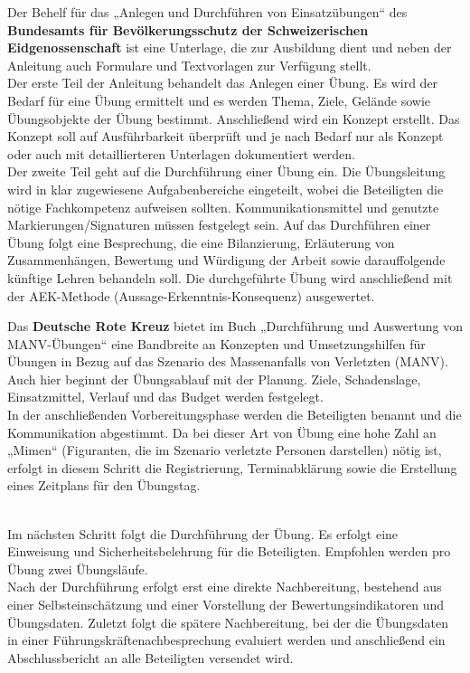 Der Behelf für das „Anlegen und Durchführen von Einsatzübungen“ des \textbf{Bundesamts für Bevölkerungsschutz der Schweizerischen Eidgenossenschaft} \autocite{Behelf_Einsatzübungen} ist eine Unterlage, die zur Ausbildung dient und neben der Anleitung auch Formulare und Textvorlagen zur Verfügung stellt. \\
Der erste Teil der Anleitung behandelt das Anlegen einer Übung. Es wird der Bedarf für eine Übung ermittelt und es werden Thema, Ziele, Gelände sowie Übungsobjekte der Übung bestimmt. Anschließend wird ein Konzept erstellt. Das Konzept soll auf Ausführbarkeit überprüft und je nach Bedarf nur als Konzept oder auch mit detaillierteren Unterlagen dokumentiert werden. \\
Der zweite Teil geht auf die Durchführung einer Übung ein. Die Übungsleitung wird in klar zugewiesene Aufgabenbereiche eingeteilt, wobei die Beteiligten die nötige Fachkompetenz aufweisen sollten. Kommunikationsmittel und genutzte Markierungen/Signaturen müssen festgelegt sein. Auf das Durchführen einer Übung folgt eine Besprechung, die eine Bilanzierung, Erläuterung von Zusammenhängen, Bewertung und Würdigung der Arbeit sowie darauffolgende künftige Lehren behandeln soll. Die durchgeführte Übung wird anschließend mit der AEK-Methode (Aussage-Erkenntnis-Konsequenz) ausgewertet. \ 


Das \textbf{Deutsche Rote Kreuz} bietet im Buch „Durchführung und Auswertung von MANV-Übungen“ \autocite{MANV-Übungen} eine Bandbreite an Konzepten und Umsetzungshilfen für Übungen in Bezug auf das Szenario des Massenanfalls von Verletzten (MANV).
Auch hier beginnt der Übungsablauf mit der Planung. Ziele, Schadenslage, Einsatzmittel, Verlauf und das Budget werden festgelegt. \\
In der anschließenden Vorbereitungsphase werden die Beteiligten benannt und die Kommunikation abgestimmt. Da bei dieser Art von Übung eine hohe Zahl an „Mimen“ (Figuranten, die im Szenario verletzte Personen darstellen) nötig ist, erfolgt in diesem Schritt die Registrierung, Terminabklärung sowie die Erstellung eines Zeitplans für den Übungstag. \\

\ 

Im nächsten Schritt folgt die Durchführung der Übung. Es erfolgt eine Einweisung und Sicherheitsbelehrung für die Beteiligten. Empfohlen werden pro Übung zwei Übungsläufe. \\
Nach der Durchführung erfolgt erst eine direkte Nachbereitung, bestehend aus einer Selbsteinschätzung und einer Vorstellung der Bewertungsindikatoren und Übungsdaten. Zuletzt folgt die spätere Nachbereitung, bei der die Übungsdaten in einer Führungskräftenachbesprechung evaluiert werden und anschließend ein Abschlussbericht an alle Beteiligten versendet wird. \\

